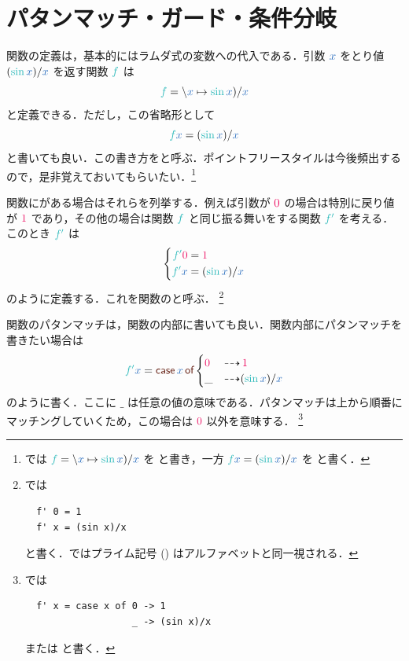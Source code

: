 \documentclass[a5paper,twoside,fleqn,draft]{jsbook}
\begin{document}
\section{パタンマッチ・ガード・条件分岐}

関数の定義は，基本的にはラムダ式の変数への代入である．引数 $\hVar{x}$ をとり値 $(\hSin\hVar{x})/\hVar{x}$ を返す関数 $\hFunc{f}$ は
\begin{equation}
  \hFunc{f}=\hLambdaSyntax{\hVar{x}}{\hSin\hVar{x})/\hVar{x}}
\end{equation}
と定義できる．ただし，この省略形として
\begin{equation}
  \hFunc{f}\hVar{x}
  =(\hSin\hVar{x})/\hVar{x}
\end{equation}
と書いても良い．この書き方をと呼ぶ．ポイントフリースタイルは今後頻出するので，是非覚えておいてもらいたい．\footnote{\haskell では $\hFunc{f}=\hLambdaSyntax{\hVar{x}}{\hSin\hVar{x})/\hVar{x}}$ を  と書き，一方 $\hFunc{f}\hVar{x}=(\hSin\hVar{x})/\hVar{x}$ を と書く．}

\separator

関数にがある場合はそれらを列挙する．例えば引数が $\hConstant{0}$ の場合は特別に戻り値が $\hConstant{1}$ であり，その他の場合は関数 $\hFunc{f}$ と同じ振る舞いをする関数 $\hFunc{f'}$ を考える．このとき $\hFunc{f'}$ は
\begin{equation}
  \left\{
  \begin{aligned}
    \hFunc{f'}\hConstant{0}&=\hConstant{1}\\
    \hFunc{f'}\hVar{x}&=(\hSin\hVar{x})/\hVar{x}
  \end{aligned}
  \right.
\end{equation}
のように定義する．これを関数のと呼ぶ．
\footnote{\haskell では
\begin{verbatim}
  f' 0 = 1
  f' x = (sin x)/x
\end{verbatim}
と書く．\haskell ではプライム記号 () はアルファベットと同一視される．}

関数のパタンマッチは，関数の内部に書いても良い．関数内部にパタンマッチを書きたい場合は
\begin{equation}
  \hFunc{f'}\hVar{x}=\hCaseSyntax{\hVar{x}}
  \begin{cases}
    \hConstant{0}&\hIfSo\hConstant{1}\\
    \_&\hIfSo(\hSin\hVar{x})/\hVar{x}
  \end{cases}
\end{equation}
のように書く．ここに $\_$ は任意の値の意味である．パタンマッチは上から順番にマッチングしていくため，この場合は $\hConstant{0}$ 以外を意味する．
\footnote{\haskell では
\begin{verbatim}
  f' x = case x of 0 -> 1
                   _ -> (sin x)/x
\end{verbatim}
または  と書く．}
\end{document}
